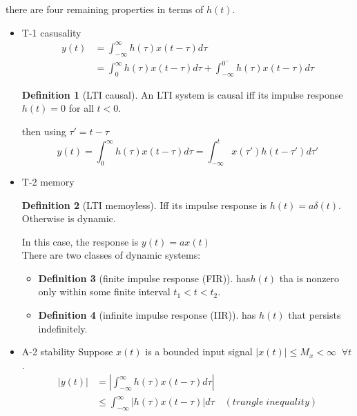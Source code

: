 \documentclass{article}
\theoremstyle{definition}
\newtheorem{definition}{Definition}[subsection]
\begin{document}
there are four remaining properties in terms of $ h(t) $.
\begin{itemize}
    \item T-1 casusality
        \begin{align*}
            y(t) &= \int_{-\infty}^{\infty} h(\tau)x(t-\tau)d\tau \\
                 &= \int _0^{\infty}h(\tau)x(t-\tau)d\tau +\int_{-\infty}^{0^-}h(\tau)x(t-\tau)d\tau
        \end{align*}
        \begin{definition}[LTI causal]
            An LTI system is causal iff its impulse response $ h(t)=0 $ for all $ t<0 $.
        \end{definition}
        then using $ \tau ' = t-\tau $
        \begin{equation}
            y(t)=\int _0^{\infty}h(\tau)x(t-\tau)d\tau=\int_{-\infty}^t x(\tau ')h(t-\tau ')d\tau'
        \end{equation}
    \item T-2 memory
        \begin{definition}[LTI memoyless]
            Iff its impulse response is $ h(t) = a\delta(t) $. Otherwise is dynamic.
        \end{definition}
        In this case, the response is $ y(t)=ax(t) $\\
        There are two classes of dynamic systems:
        \begin{itemize}
            \item \begin{definition}[finite impulse response (FIR)]
                has$ h(t) $ tha is nonzero only within some finite interval $ t_1<t<t_2 $.
            \end{definition}
            \item \begin{definition}[infinite impulse response (IIR)]
                has $ h(t) $ that persists indefinitely.
            \end{definition}
        \end{itemize}
    \item A-2 stability
        Suppose $ x(t) $ is a bounded input signal $ |x(t)| \leq M_x < \infty\;\; \forall t $.
        \begin{align*}
            |y(t)| &= |\int_{-\infty}^{\infty} h(\tau)x(t-\tau)d\tau| \\
                   &\leq \int_{-\infty}^{\infty} |h(\tau)x(t-\tau)| d\tau \quad (trangle\; inequality) \\

\end{align*}
\end{itemize}
\end{document}
